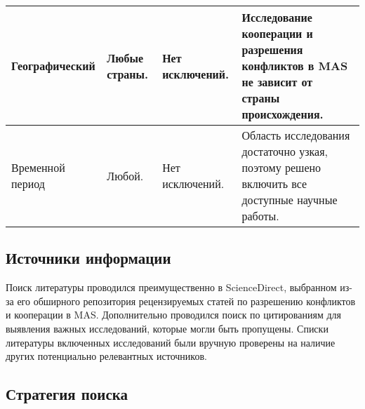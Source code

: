 \begin{table}
\begin{footnotesize}
\begin{longtable}{|p{}|p{}|p{}|p{}|}
    \hline
 Географический   & Любые страны.                                                                                                                                            & Нет исключений.                                                                       & Исследование кооперации и разрешения конфликтов в MAS не зависит от страны происхождения.                                 \\
    \hline
 Временной период & Любой.                                                                                                                                                   & Нет исключений.                                                                       & Область исследования достаточно узкая, поэтому решено включить все доступные научные работы.                              \\
    \hline
  \end{longtable}
  \end{footnotesize}
\end{table}

\subsection{Источники информации}

Поиск литературы проводился преимущественно в ScienceDirect,
выбранном из-за его обширного репозитория рецензируемых статей
по разрешению конфликтов и кооперации в MAS.
Дополнительно проводился поиск по цитированиям для выявления
важных исследований, которые могли быть пропущены. Списки литературы
включенных исследований были вручную проверены на наличие других
потенциально релевантных источников.

\subsection{Стратегия поиска}

